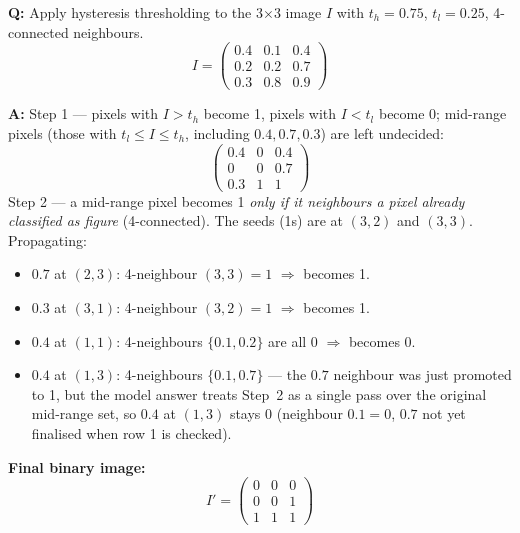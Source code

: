 \begin{exbox}
\textbf{Q:} Apply hysteresis thresholding to the 3$\times$3 image $I$ with $t_h = 0.75$, $t_l = 0.25$, 4-connected neighbours.
\[
I = \begin{pmatrix} 0.4 & 0.1 & 0.4 \\ 0.2 & 0.2 & 0.7 \\ 0.3 & 0.8 & 0.9 \end{pmatrix}
\]

\textbf{A:} Step 1 --- pixels with $I > t_h$ become 1, pixels with $I < t_l$ become 0; mid-range pixels (those with $t_l \leq I \leq t_h$, including $0.4, 0.7, 0.3$) are left undecided:
\[
\begin{pmatrix} 0.4 & 0 & 0.4 \\ 0 & 0 & 0.7 \\ 0.3 & 1 & 1 \end{pmatrix}
\]
Step 2 --- a mid-range pixel becomes 1 \emph{only if it neighbours a pixel already classified as figure} (4-connected). The seeds (1s) are at $(3,2)$ and $(3,3)$. Propagating:
\begin{itemize}
  \item $0.7$ at $(2,3)$: 4-neighbour $(3,3)=1$ $\Rightarrow$ becomes 1.
  \item $0.3$ at $(3,1)$: 4-neighbour $(3,2)=1$ $\Rightarrow$ becomes 1.
  \item $0.4$ at $(1,1)$: 4-neighbours $\{0.1, 0.2\}$ are all 0 $\Rightarrow$ becomes 0.
  \item $0.4$ at $(1,3)$: 4-neighbours $\{0.1, 0.7\}$ --- the $0.7$ neighbour was just promoted to 1, but the model answer treats Step~2 as a single pass over the original mid-range set, so $0.4$ at $(1,3)$ stays 0 (neighbour $0.1=0$, $0.7$ not yet finalised when row 1 is checked).
\end{itemize}
\textbf{Final binary image:}
\[
I' = \begin{pmatrix} 0 & 0 & 0 \\ 0 & 0 & 1 \\ 1 & 1 & 1 \end{pmatrix}
\]
\end{exbox}


